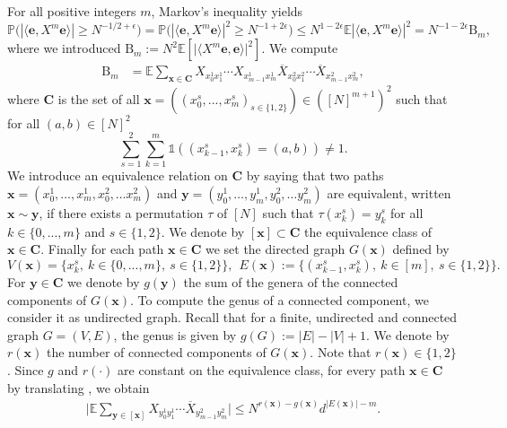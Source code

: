 \documentclass[10pt,a4paper]{amsart}
\newcommand{\absbb}[1]{\biggl| #1 \biggr|}
\newcommand{\patx}{\boldsymbol{x}}
\newcommand{\paty}{\boldsymbol{y}}
\numberwithin{equation}{section}
\begin{document}
For all positive integers $m$, Markov's inequality yields 
\begin{equation}\label{eq:bound_pb_Am2}
  \mathbb{P} \bigl( |\langle \mathbf e, X^m \mathbf e \rangle| \ge N^{-1/2+ \epsilon} \bigr) =  \mathbb{P} \bigl( |\langle \mathbf e, X^m \mathbf e \rangle|^2 \ge N^{-1 + 2 \epsilon}\bigr) \le N^{1- 2\epsilon}{\mathbb{E} |\langle \mathbf e, X^m \mathbf e \rangle|^2}
  = N^{-1 -2 \epsilon} \mathrm{B}_m, 
\end{equation}
where we introduced $\mathrm{B}_{m}:= N^2\mathbb{E}[\big|\langle X^m \mathbf e, \mathbf e \rangle \big|^2]$. We compute 
    \begin{align*}
\mathrm{B}_{m} &= \mathbb{E} \sum_{\patx\in \boldsymbol C} X_{x_0^1 x_1^1} \cdots X_{x_{m-1}^{1} x_{m}^{1}} \overline{X}_{x_{0}^{2} x_{1}^{2}} \cdots\overline{X}_{x_{m-1}^2 x_m^2}, 
    \end{align*}
where $\boldsymbol{C}$ is the set of all $\patx = ((x^s_0,...,x^s_m)_{s\in \{1,2\}}) \in ([N]^{m+1})^2$ such that for all $(a,b) \in [N]^2$
    $$\sum_{s=1}^2\sum_{k=1}^m \mathds{1}\left( (x^s_{k-1} , x^s_{k}) = (a,b) \right) \neq 1.$$
   We introduce an equivalence relation on $\boldsymbol C$ by saying that two paths $\patx=(x_0^1,\ldots, x_m^1,x_0^2, \ldots x_m^2)$ and $\boldsymbol y=(y_0^1,\ldots, y_m^1,y_0^2, \ldots y_m^2)$ are equivalent, written $\patx \sim \boldsymbol y$,  if there exists a permutation $\tau$ of $[N]$ such that $\tau(x_k^s) = {y}^s_k$ for all $k \in \{0,...,m\}$ and $s \in \{1,2\}$. We denote by $[\patx] \subset \boldsymbol C$ the equivalence class of $\patx \in \boldsymbol C$. Finally for each path $\patx \in \boldsymbol C$ we set the directed graph $G(\patx)$ defined by
\begin{equation*}
    V(\patx) = \{x_k^s,~k\in \{0,...,m \}, ~ s \in  \{1,2\}\}, ~~ E(\patx):= \{ (x_{k-1}^s, x_k^s),~k \in [m],~ s \in  \{1,2\}\}.
\end{equation*}
 For $\paty \in \boldsymbol C$ we denote by $g(\paty)$ the  sum of the genera of the connected components of $G(\patx)$. To compute the genus of a connected component, we consider it as undirected graph. Recall that for a finite, undirected and connected graph $G=(V,E)$, the genus is given by $g(G):= |E|-|V|+1$. 
We denote by $r(\patx)$ the number of connected components of $G(\patx)$. Note that $ r(\patx) \in \{1 , 2\}$. Since $g$ and $r(\cdot)$ are constant on the equivalence class, for every  path $\patx \in \boldsymbol C$ by translating \cite[proof of Lemma~5.3]{BBK_spec_radii}, we obtain
\begin{align}\label{eq:estimate_x_fixed}
    \absbb{\mathbb{E} \sum_{\paty  \in [ \patx]} X_{y^1_0 y^1_{1}} \cdots  \overline{X}_{y^2_{m-1} y^2_{m}}}\le N^{r(\patx) - g(\patx)} d^{|E(\patx)|-m}.
\end{align}
\end{document}
